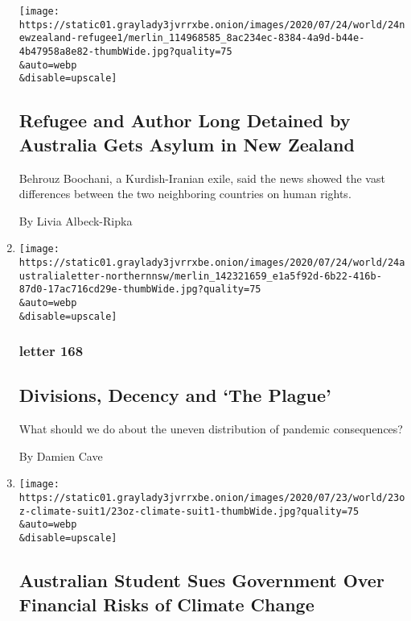 \begin{enumerate}
  \texttt{[image: https://static01.graylady3jvrrxbe.onion/images/2020/07/24/world/24newzealand-refugee1/merlin\_114968585\_8ac234ec-8384-4a9d-b44e-4b47958a8e82-thumbWide.jpg?quality=75\\\&auto=webp\\\&disable=upscale]}

  \hypertarget{refugee-and-author-long-detained-by-australia-gets-asylum-in-new-zealand}{%
  \subsection{Refugee and Author Long Detained by Australia Gets Asylum
  in New
  Zealand}\label{refugee-and-author-long-detained-by-australia-gets-asylum-in-new-zealand}}

  Behrouz Boochani, a Kurdish-Iranian exile, said the news showed the
  vast differences between the two neighboring countries on human
  rights.

  By Livia Albeck-Ripka
\item
  \href{/2020/07/24/world/australia/divisions-decency-and-the-plague.html}{}

  \texttt{[image: https://static01.graylady3jvrrxbe.onion/images/2020/07/24/world/24australialetter-northernnsw/merlin\_142321659\_e1a5f92d-6b22-416b-87d0-17ac716cd29e-thumbWide.jpg?quality=75\\\&auto=webp\\\&disable=upscale]}

  \hypertarget{letter-168}{%
  \subsubsection{letter 168}\label{letter-168}}

  \hypertarget{divisions-decency-and-the-plague}{%
  \subsection{Divisions, Decency and `The
  Plague'}\label{divisions-decency-and-the-plague}}

  What should we do about the uneven distribution of pandemic
  consequences?

  By Damien Cave
\item
  \href{/2020/07/23/world/australia/lawsuit-climate-change-bonds.html}{}

  \texttt{[image: https://static01.graylady3jvrrxbe.onion/images/2020/07/23/world/23oz-climate-suit1/23oz-climate-suit1-thumbWide.jpg?quality=75\\\&auto=webp\\\&disable=upscale]}

  \hypertarget{australian-student-sues-government-over-financial-risks-of-climate-change}{%
  \subsection{Australian Student Sues Government Over Financial Risks of
  Climate
  Change}\label{australian-student-sues-government-over-financial-risks-of-climate-change}}


\end{enumerate}
